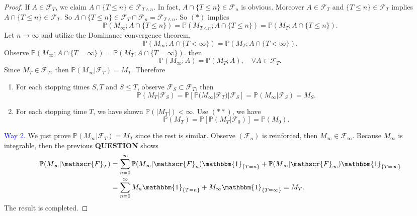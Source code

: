 \documentclass[12pt]{article}
\renewcommand{\(}{\left(}%
\renewcommand{\)}{\right)}%
\renewcommand{\[}{\left[}%
\renewcommand{\]}{\right]}%
\newcommand{\p}{\mathbb{P}}
\newcommand{\f}{\mathscr{F}}
\newtheorem{proof}{Proof.}}
\begin{document}
\begin{proof}
   If $A\in \f_T$, we claim $A\cap \{T\leq n\}\in \f_{T\wedge n}$. In fact, $A\cap \{T\leq n\}\in \f_n$ is obvious. Moreover $A\in\f_T$ and $\{T\leq n\}\in\f_T$ implies $A\cap \{T\leq n\}\in\f_T$. So $A\cap \{T\leq n\}\in \f_T\cap \f_n=\f_{T\wedge n}$. So $(*)$ implies
   \begin{equation*}
    \p(M_\infty;A\cap \{T\leq n\} )=\p(M_{T\wedge n};A\cap \{T\leq n\})=\p(M_T;A\cap \{T\leq n\}).
   \end{equation*}
   Let $n\to\infty$ and utilize the {\sffamily Dominance convergence theorem},
   \begin{equation*}
    \p(M_\infty;A\cap\{T<\infty\} )=\p(M_T;A\cap\{T<\infty\} ).
   \end{equation*}
   Observe $\p(M_\infty;A\cap\{T=\infty\} )=\p(M_T;A\cap\{T=\infty\} )$. then
   \begin{equation*}
    \p(M_\infty;A )=\p(M_T;A ), \quad \forall A\in\f_T.
   \end{equation*}
   Since $M_T\in\f_T$, then $\p(M_\infty|\f_T)=M_T$. Therefore
   \begin{enumerate}
    \item For each stopping times $S,T$ and $S\leq T$, observe $\f_S\subset\f_T$, then
    \begin{equation*}
     \p(M_T|\f_S)=\p[\p(M_\infty|\f_T)|\f_S]=\p(M_\infty|\f_S)=M_S.\tag{$**$}
    \end{equation*}
    \item For each stopping time $T$, we have shown $\p(|M_T|)<\infty$. Use $(**)$, we have
    \begin{equation*}
     \p(M_T)=\p[\p(M_T|\f_0)]=\p(M_0).
    \end{equation*}
   \end{enumerate}
   \textcolor{blue}{\sffamily Way 2.} We just prove $\p(M_\infty|\f_T)=M_T$ since the rest is similar. Observe $(\f_n)$ is reinforced, then $M_\infty\in\f_\infty$. Because $M_\infty$ is integrable, then the previous {\bfseries QUESTION} shows
   \begin{equation*}
    \begin{split}
     \p(M_\infty|\f_T )&=\sum_{n=0}^\infty \p(M_\infty|\f_n)\mathbbm{1}_{\{T=n\}}+\p(M_\infty|\f_\infty)\mathbbm{1}_{\{T=\infty\}}\\
     &=\sum_{n=0}^\infty M_n\mathbbm{1}_{\{T=n\}}+M_\infty\mathbbm{1}_{\{T=\infty\}}=M_T.    \end{split}
   \end{equation*}
   The result is completed.
  \end{proof}
\end{document}
